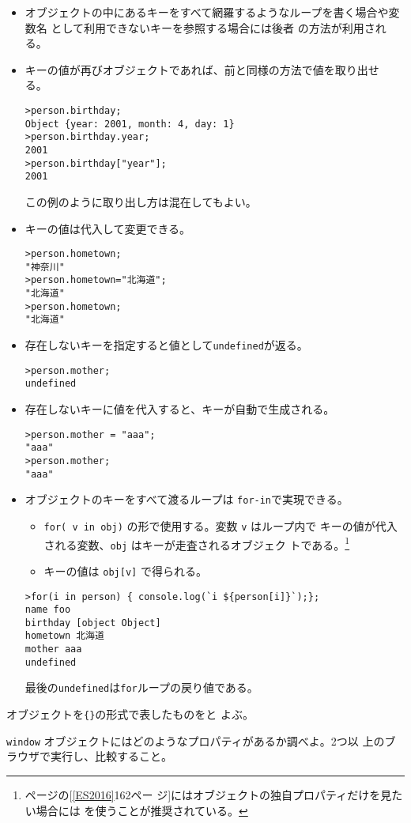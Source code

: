 \begin{Exec}
\begin{itemize}
 \item オブジェクトの中にあるキーをすべて網羅するようなループを書く場合や変数名
       として利用できないキーを参照する場合には後者
       の方法が利用される。
 \item キーの値が再びオブジェクトであれば、前と同様の方法で値を取り出せ
       る。
\begin{Verbatim}
>person.birthday;
Object {year: 2001, month: 4, day: 1}
>person.birthday.year;
2001
>person.birthday["year"];
2001
\end{Verbatim}
この例のように取り出し方は混在してもよい。
 \item キーの値は代入して変更できる。
\begin{Verbatim}
>person.hometown;
"神奈川"
>person.hometown="北海道";
"北海道"
>person.hometown;
"北海道"
\end{Verbatim}
 \item 存在しないキーを指定すると値として\verb+undefined+が返る。
\begin{Verbatim}
>person.mother;
undefined
\end{Verbatim}
 \item 存在しないキーに値を代入すると、キーが自動で生成される。
\begin{Verbatim}
>person.mother = "aaa";
"aaa"
>person.mother;
"aaa"
\end{Verbatim}
 \item オブジェクトのキーをすべて渡るループは \verb+for-in+で実現できる。
\begin{itemize}
 \item \verb+for( v in obj)+ の形で使用する。変数 \verb+v+ はループ内で
       キーの値が代入される変数、\verb+obj+ はキーが走査されるオブジェク
       トである。\footnote{\pageref{ES2016}ページの[\ref{ES2016}162ペー
       ジ]にはオブジェクトの独自プロパティだけを見たい場合には
       を使うことが推奨されている。}
 \item キーの値は \verb+obj[v]+ で得られる。
\end{itemize}
\begin{Verbatim}
>for(i in person) { console.log(`i ${person[i]}`);};
name foo
birthday [object Object]
hometown 北海道
mother aaa
undefined
\end{Verbatim}
最後の\verb+undefined+は\verb+for+ループの戻り値である。
\end{itemize}
\end{Exec}
オブジェクトを\verb+{}+の形式で表したものをと
よぶ。
\begin{Prob}\upshape
\verb+window+ オブジェクトにはどのようなプロパティがあるか調べよ。2つ以
 上のブラウザで実行し、比較すること。
\end{Prob}

